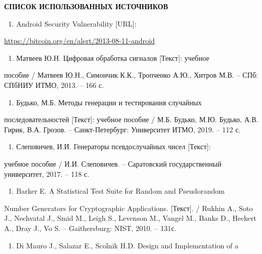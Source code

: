 \clearpage
\textbf{СПИСОК ИСПОЛЬЗОВАННЫХ ИСТОЧНИКОВ}

\begin{enumerate}
\def\labelenumi{\arabic{enumi}.}
\item
  Android Security Vulnerability {[}URL{]}:
\end{enumerate}

\url{https://bitcoin.org/en/alert/2013-08-11-android}

\begin{enumerate}
\def\labelenumi{\arabic{enumi}.}
\setcounter{enumi}{1}
\item
  Матвеев Ю.Н. Цифровая обработка сигналов {[}Текст{]}: учебное
\end{enumerate}

пособие / Матвеев Ю.Н., Симончик К.К., Тропченко А.Ю., Хитров М.В. --
СПб: СПбНИУ ИТМО, 2013. -- 166 с.

\begin{enumerate}
\def\labelenumi{\arabic{enumi}.}
\setcounter{enumi}{2}
\item
  Будько, М.Б. Методы генерации и тестирования случайных
\end{enumerate}

последовательностей {[}Текст{]}: учебное пособие / М.Б. Будько, М.Ю.
Будько, А.В. Гирик, В.А. Грозов. -- Санкт-Петербург: Университет ИТМО,
2019. -- 112 с.

\begin{enumerate}
\def\labelenumi{\arabic{enumi}.}
\setcounter{enumi}{3}
\item
  Слеповичев, И.И. Генераторы псевдослучайных чисел {[}Текст{]}:
\end{enumerate}

учебное пособие / И.И. Слеповичев. -- Саратовский государственный
университет, 2017. -- 118 с.

\begin{enumerate}
\def\labelenumi{\arabic{enumi}.}
\setcounter{enumi}{4}
\item
  Barker E. A Statistical Test Suite for Random and Pseudorandom
\end{enumerate}

Number Generators for Cryptographic Applications. {[}Текст{]}. / Rukhin
A., Soto J., Nechvatal J., Smid M., Leigh S., Levenson M., Vangel M.,
Banks D., Heckert A., Dray J., Vo S. -- Gaithersburg: NIST, 2010. --
131с.

\begin{enumerate}
\def\labelenumi{\arabic{enumi}.}
\setcounter{enumi}{5}
\item
  Di Mauro J., Salazar E., Scolnik H.D. Design and Implementation of a
\end{enumerate}

